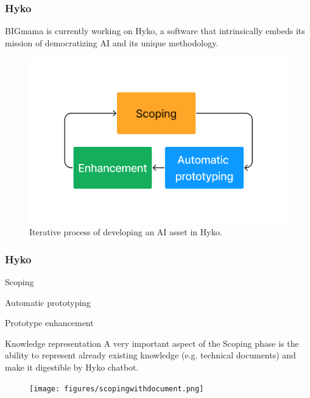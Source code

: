 \documentclass{beamer}
\begin{document}
\begin{frame}
    \frametitle{Hyko}
    BIGmama is currently working on Hyko, a software that intrinsically embeds its mission of 
    democratizing AI and its unique methodology. 
    \begin{figure}[h]
        \centering
        \includegraphics[width=.5\linewidth]{figures/3process.png}
        \caption{Iterative process of developing an AI asset in Hyko.}
        \label{fig:hykoprocess}
    \end{figure}
\end{frame}

\begin{frame}
    \frametitle{Hyko}
    \begin{block}{Scoping}
        
    \end{block}
    \begin{block}{Automatic prototyping}
        
    \end{block}
    \begin{block}{Prototype enhancement}
        
    \end{block}
\end{frame}

\begin{frame}{Knowledge representation}
A very important aspect of the Scoping phase is the ability to represent already existing knowledge 
(e.g. technical documents) and make it digestible by Hyko chatbot. 

\begin{figure}[h]
    \centering
    \texttt{[image: figures/scopingwithdocument.png]}
\end{figure}
\end{frame}
\end{document}
